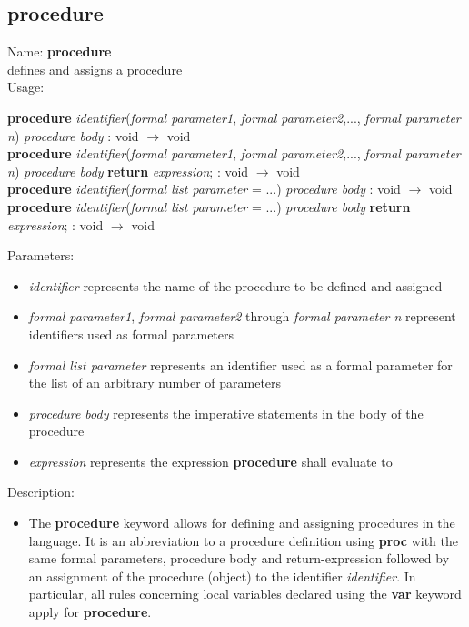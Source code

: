 \subsection{procedure}
\label{labprocedure}
\noindent Name: \textbf{procedure}\\
\phantom{aaa}defines and assigns a \sollya procedure\\[0.2cm]
\noindent Usage: 
\begin{center}
\textbf{procedure} \emph{identifier}(\emph{formal parameter1}, \emph{formal parameter2},..., \emph{formal parameter n}) \key{$\lbrace$} \emph{procedure body} \key{$\rbrace$} : \textsf{void} $\rightarrow$ \textsf{void}\\
\textbf{procedure} \emph{identifier}(\emph{formal parameter1}, \emph{formal parameter2},..., \emph{formal parameter n}) \key{$\lbrace$} \emph{procedure body} \textbf{return} \emph{expression}; \key{$\rbrace$} : \textsf{void} $\rightarrow$ \textsf{void}\\
\textbf{procedure} \emph{identifier}(\emph{formal list parameter} = ...) \key{$\lbrace$} \emph{procedure body} \key{$\rbrace$} : \textsf{void} $\rightarrow$ \textsf{void}\\
\textbf{procedure} \emph{identifier}(\emph{formal list parameter} = ...) \key{$\lbrace$} \emph{procedure body} \textbf{return} \emph{expression}; \key{$\rbrace$} : \textsf{void} $\rightarrow$ \textsf{void}\\
\end{center}
Parameters: 
\begin{itemize}
\item \emph{identifier} represents the name of the procedure to be defined and assigned
\item \emph{formal parameter1}, \emph{formal parameter2} through \emph{formal parameter n} represent identifiers used as formal parameters
\item \emph{formal list parameter} represents an identifier used as a formal parameter for the list of an arbitrary number of parameters
\item \emph{procedure body} represents the imperative statements in the body of the procedure
\item \emph{expression} represents the expression \textbf{procedure} shall evaluate to
\end{itemize}
\noindent Description: \begin{itemize}

\item The \textbf{procedure} keyword allows for defining and assigning procedures in
   the \sollya language. It is an abbreviation to a procedure definition
   using \textbf{proc} with the same formal parameters, procedure body and
   return-expression followed by an assignment of the procedure (object)
   to the identifier \emph{identifier}. In particular, all rules concerning
   local variables declared using the \textbf{var} keyword apply for \textbf{procedure}.
\end{itemize}
